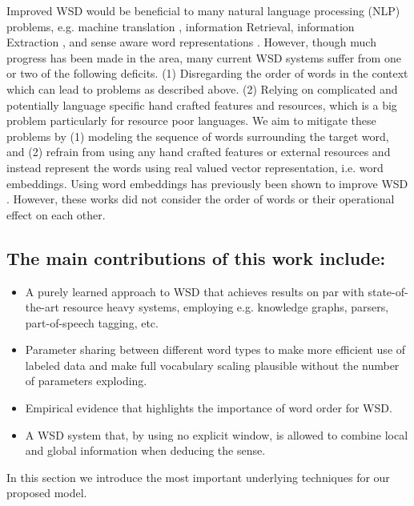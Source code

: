 \documentclass[11pt]{article}
\begin{document}
Improved WSD would be beneficial to many natural language processing (NLP) problems, e.g. machine translation \cite{vickrey2005word}, information Retrieval, information Extraction \cite{Navigli:09}, and sense aware word representations \cite{neelakantan2015efficient,kaageback2015neural,nietopina2015,bovi2015knowledge}. However, though much progress has been made in the area, many current WSD systems suffer from one or two of the following deficits. (1) Disregarding the order of words in the context which can lead to problems as described above. (2) Relying on complicated and potentially language specific hand crafted features and resources, which is a big problem particularly for resource poor languages.
We aim to mitigate these problems by (1) modeling the sequence of words surrounding the target word, and (2) refrain from using any hand crafted features or external resources and instead represent the words using real valued vector representation, i.e. word embeddings. Using word embeddings has previously been shown to improve WSD \cite{taghipour2015semi,johansson2015combining}. However, these works did not consider the order of words or their operational effect on each other.

\subsection{The main contributions of this work include:}
\begin{itemize}
\item A purely learned approach to WSD that achieves results on par with state-of-the-art resource heavy systems, employing e.g. knowledge graphs, parsers, part-of-speech tagging, etc. 
\item Parameter sharing between different word types to make more efficient use of labeled data and make full vocabulary scaling plausible without the number of parameters exploding.
\item Empirical evidence that highlights the importance of word order for WSD.
\item A WSD system that, by using no explicit window, is allowed to combine local and global information when deducing the sense.
\end{itemize}
In this section we introduce the most important underlying techniques for our proposed model. 
\end{document}
